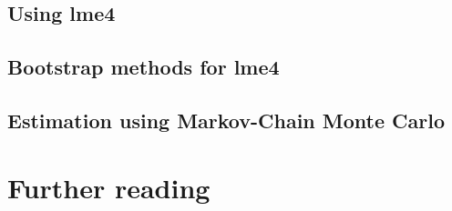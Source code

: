 \documentclass[a4paper,12pt]{article}
\begin{document}
\subsection{Using lme4}
\label{sec:usinglme4}


\subsection{Bootstrap methods for lme4}
\label{sec:bootstrapestimationforlme4}

\subsection{Estimation using Markov-Chain Monte Carlo}
\label{sec:estimationusingmarkovchainmontecarlo}

%
%

\section{Further reading}
\label{sec:furtherreading}


\printbibliography
\end{document}
